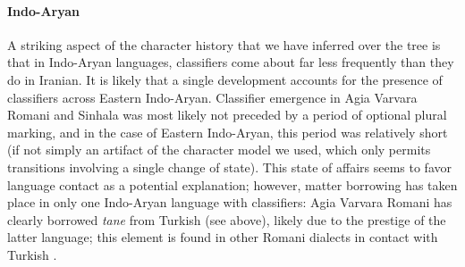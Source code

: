 \documentclass[11pt]{article}
\begin{document}
\paragraph{Indo-Aryan}
A striking aspect of the character history that we have inferred over the tree is that in Indo-Aryan languages, classifiers come about far less frequently than they do in Iranian. It is likely that a single development accounts for the presence of classifiers across Eastern Indo-Aryan. 
Classifier emergence in Agia Varvara Romani and Sinhala was most likely not preceded by a period of optional plural marking, and in the case of Eastern Indo-Aryan, this period was relatively short (if not simply an artifact of the character model we used, which only permits transitions involving a single change of state). 
This state of affairs seems to favor language contact as a potential explanation; however, matter borrowing has taken place in only one Indo-Aryan language with classifiers: 
Agia Varvara Romani has clearly borrowed {\it tane} from Turkish (see above), likely due to the prestige of the latter language; this element is found in other Romani dialects in contact with Turkish \citep[204]{Matras2002}. 
\end{document}
